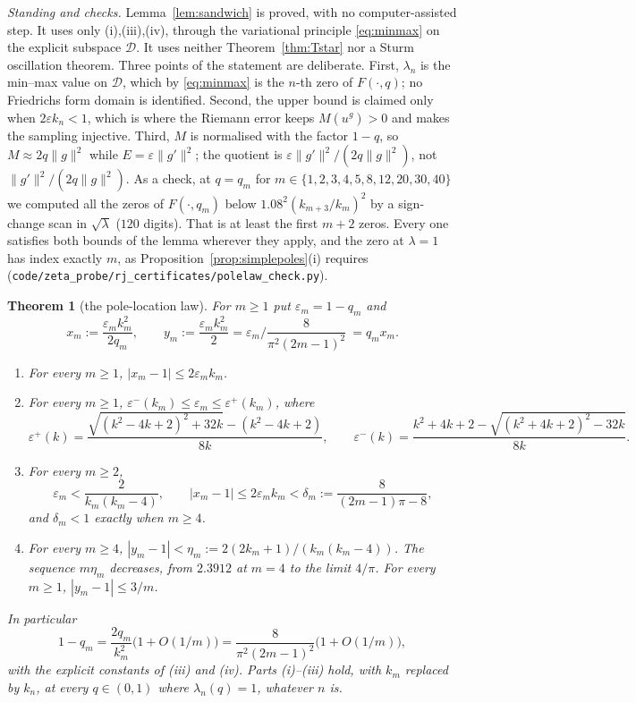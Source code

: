 \documentclass[11pt]{article}
\theoremstyle{plain}
\newtheorem{theorem}{Theorem}
\theoremstyle{definition}
\theoremstyle{remark}
\begin{document}
\noindent\emph{Standing and checks.} Lemma~\ref{lem:sandwich} is proved, with no computer-assisted
step. It uses only {\cite[Theorem ``the travel determinant'', \textup{thm:fredholm}]{Bonfioli2026bA}}\textup{(i)},\textup{(iii)},\textup{(iv)}, through the
variational principle \eqref{eq:minmax} on the explicit subspace $\mathcal D$. It uses neither
Theorem~\ref{thm:Tstar} nor a Sturm oscillation theorem. Three points of the statement are
deliberate. First, $\lambda_n$ is the min--max value on $\mathcal D$, which by \eqref{eq:minmax} is
the $n$-th zero of $F(\cdot,q)$; no Friedrichs form domain is identified. Second, the upper bound
is claimed only when $2\varepsilon k_n<1$, which is where the Riemann error keeps $M(u^g)>0$ and
makes the sampling injective. Third, $M$ is normalised with the factor $1-q$, so $M\approx2q\|g\|^2$
while $E=\varepsilon\|g'\|^2$; the quotient is $\varepsilon\|g'\|^2/(2q\|g\|^2)$, not
$\|g'\|^2/(2q\|g\|^2)$. As a check, at $q=q_m$ for $m\in\{1,2,3,4,5,8,12,20,30,40\}$ we computed all
the zeros of $F(\cdot,q_m)$ below $1.08^2(k_{m+3}/k_m)^2$ by a sign-change scan in $\sqrt\lambda$ ($120$
digits). That is at least the first $m+2$ zeros. Every one satisfies both bounds of the lemma wherever they apply, and the zero
at $\lambda=1$ has index exactly $m$, as Proposition~\ref{prop:simplepoles}\textup{(i)} requires
(\texttt{code/\allowbreak zeta\_probe/\allowbreak rj\_certificates/\allowbreak polelaw\_check.py}).

\begin{theorem}[the pole-location law]\label{thm:polelaw}
For $m\ge1$ put $\varepsilon_m=1-q_m$ and
\[
   x_m:=\frac{\varepsilon_mk_m^2}{2q_m},\qquad
   y_m:=\frac{\varepsilon_mk_m^2}{2}=\varepsilon_m\Big/\frac{8}{\pi^2(2m-1)^2}\ =q_mx_m .
\]
\begin{enumerate}[label=\textup{(\roman*)},leftmargin=2.2em,itemsep=0.1em,topsep=0.2em]
\item For every $m\ge1$, $|x_m-1|\le2\varepsilon_mk_m$.
\item For every $m\ge1$, $\varepsilon^-(k_m)\le\varepsilon_m\le\varepsilon^+(k_m)$, where
\[
   \varepsilon^+(k)=\frac{\sqrt{(k^2-4k+2)^2+32k}-(k^2-4k+2)}{8k},\qquad
   \varepsilon^-(k)=\frac{k^2+4k+2-\sqrt{(k^2+4k+2)^2-32k}}{8k} .
\]
\item For every $m\ge2$,
\[
   \varepsilon_m<\frac{2}{k_m(k_m-4)},\qquad
   |x_m-1|\le2\varepsilon_mk_m<\delta_m:=\frac{8}{(2m-1)\pi-8} ,
\]
and $\delta_m<1$ exactly when $m\ge4$.
\item For every $m\ge4$, $|y_m-1|<\eta_m:=2(2k_m+1)/(k_m(k_m-4))$. The sequence $m\eta_m$ decreases,
from $2.3912$ at $m=4$ to the limit $4/\pi$. For every $m\ge1$, $|y_m-1|\le3/m$.
\end{enumerate}
In particular
\[
   1-q_m=\frac{2q_m}{k_m^2}\bigl(1+O(1/m)\bigr)=\frac{8}{\pi^2(2m-1)^2}\bigl(1+O(1/m)\bigr),
\]
with the explicit constants of \textup{(iii)} and \textup{(iv)}. Parts \textup{(i)}--\textup{(iii)}
hold, with $k_m$ replaced by $k_n$, at every $q\in(0,1)$ where $\lambda_n(q)=1$, whatever $n$ is.
\end{theorem}
\end{document}
